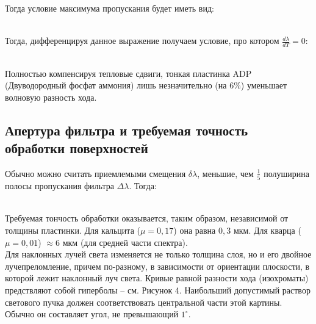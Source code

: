 
Тогда условие максимума пропускания будет иметь вид:

 \\

Тогда, дифференцируя данное выражение получаем условие, про котором
$ \frac{d\lambda}{dT} = 0 $:

 \\

Полностью компенсируя тепловые сдвиги, тонкая пластинка ADP (Двуводородный фосфат аммония)
лишь незначительно (на 6\%) уменьшает волновую разность хода.

\subsection{Апертура фильтра и требуемая точность обработки поверхностей}

Обычно можно считать приемлемыми смещения $ \delta\lambda $, меньшие, чем $ \frac{1}{5} $
полуширина полосы пропускания фильтра $ \Delta\lambda $. Тогда:

 \\

Требуемая тончость обработки оказывается, таким образом, независимой от толщины пластинки.
Для кальцита ($ \mu = 0,17 $) она равна $ 0,3 $ мкм. Для кварца ($ \mu = 0,01 $)
$ \approx 6 $ мкм (для средней части спектра). \\

Для наклонных лучей света изменяется не только толщина слоя, но и его двойное
лучепреломление, причем по-разному, в зависимости от ориентации плоскости, в которой
лежит наклонный луч света. Кривые равной разности хода (изохроматы) предствляют собой
гиперболы -- см. Рисунок 4. Наибольший допустимый раствор светового пучка должен
соответствовать центральной части этой картины. Обычно он составляет угол, не
превышающий $ 1^\circ $.

